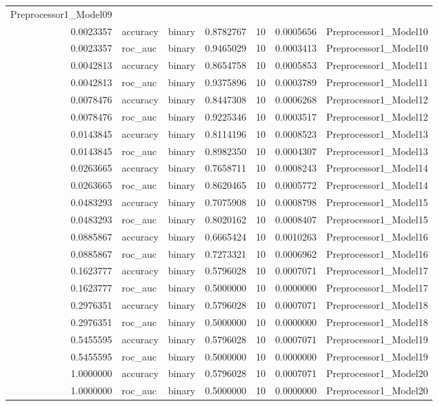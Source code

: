 \documentclass[
]{article}
\begin{document}
\begin{longtable}[]{@{}rllrrrl@{}}
Preprocessor1\_Model09 \\
0.0023357 & accuracy & binary & 0.8782767 & 10 & 0.0005656 &
Preprocessor1\_Model10 \\
0.0023357 & roc\_auc & binary & 0.9465029 & 10 & 0.0003413 &
Preprocessor1\_Model10 \\
0.0042813 & accuracy & binary & 0.8654758 & 10 & 0.0005853 &
Preprocessor1\_Model11 \\
0.0042813 & roc\_auc & binary & 0.9375896 & 10 & 0.0003789 &
Preprocessor1\_Model11 \\
0.0078476 & accuracy & binary & 0.8447308 & 10 & 0.0006268 &
Preprocessor1\_Model12 \\
0.0078476 & roc\_auc & binary & 0.9225346 & 10 & 0.0003517 &
Preprocessor1\_Model12 \\
0.0143845 & accuracy & binary & 0.8114196 & 10 & 0.0008523 &
Preprocessor1\_Model13 \\
0.0143845 & roc\_auc & binary & 0.8982350 & 10 & 0.0004307 &
Preprocessor1\_Model13 \\
0.0263665 & accuracy & binary & 0.7658711 & 10 & 0.0008243 &
Preprocessor1\_Model14 \\
0.0263665 & roc\_auc & binary & 0.8620465 & 10 & 0.0005772 &
Preprocessor1\_Model14 \\
0.0483293 & accuracy & binary & 0.7075908 & 10 & 0.0008798 &
Preprocessor1\_Model15 \\
0.0483293 & roc\_auc & binary & 0.8020162 & 10 & 0.0008407 &
Preprocessor1\_Model15 \\
0.0885867 & accuracy & binary & 0.6665424 & 10 & 0.0010263 &
Preprocessor1\_Model16 \\
0.0885867 & roc\_auc & binary & 0.7273321 & 10 & 0.0006962 &
Preprocessor1\_Model16 \\
0.1623777 & accuracy & binary & 0.5796028 & 10 & 0.0007071 &
Preprocessor1\_Model17 \\
0.1623777 & roc\_auc & binary & 0.5000000 & 10 & 0.0000000 &
Preprocessor1\_Model17 \\
0.2976351 & accuracy & binary & 0.5796028 & 10 & 0.0007071 &
Preprocessor1\_Model18 \\
0.2976351 & roc\_auc & binary & 0.5000000 & 10 & 0.0000000 &
Preprocessor1\_Model18 \\
0.5455595 & accuracy & binary & 0.5796028 & 10 & 0.0007071 &
Preprocessor1\_Model19 \\
0.5455595 & roc\_auc & binary & 0.5000000 & 10 & 0.0000000 &
Preprocessor1\_Model19 \\
1.0000000 & accuracy & binary & 0.5796028 & 10 & 0.0007071 &
Preprocessor1\_Model20 \\
1.0000000 & roc\_auc & binary & 0.5000000 & 10 & 0.0000000 &
Preprocessor1\_Model20 \\
\bottomrule
\end{longtable}
\end{document}
